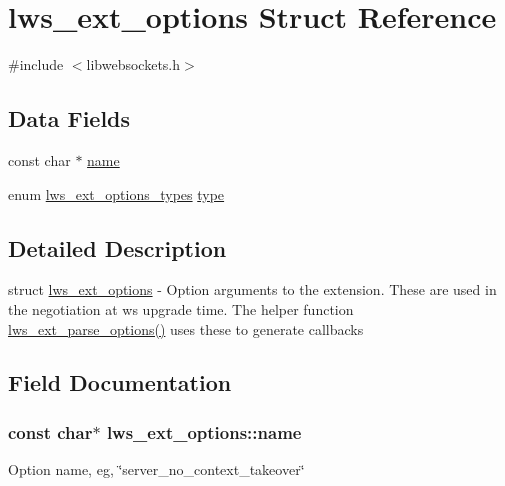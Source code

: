 \hypertarget{structlws__ext__options}{}\section{lws\+\_\+ext\+\_\+options Struct Reference}
\label{structlws__ext__options}


{\ttfamily \#include $<$libwebsockets.\+h$>$}

\subsection*{Data Fields}
\begin{DoxyCompactItemize}
\item 
const char $\ast$ \hyperlink{structlws__ext__options_a1769e4a9805bbdda227821e9578ddc7e}{name}
\item 
enum \hyperlink{group__extensions_gacc9f55936dc165257a2e1f7d47bce89e}{lws\+\_\+ext\+\_\+options\+\_\+types} \hyperlink{structlws__ext__options_a7c4dbd62dbeba63a9d50d2306bd1cc61}{type}
\end{DoxyCompactItemize}


\subsection{Detailed Description}
struct \hyperlink{structlws__ext__options}{lws\+\_\+ext\+\_\+options} -\/ Option arguments to the extension. These are used in the negotiation at ws upgrade time. The helper function \hyperlink{group__extensions_ga6fb3e2c3dfb9d64dc87026a4e99c128b}{lws\+\_\+ext\+\_\+parse\+\_\+options()} uses these to generate callbacks 

\subsection{Field Documentation}
\subsubsection[{\texorpdfstring{name}{name}}]{\setlength{\rightskip}{0pt plus 5cm}const char$\ast$ lws\+\_\+ext\+\_\+options\+::name}\hypertarget{structlws__ext__options_a1769e4a9805bbdda227821e9578ddc7e}{}\label{structlws__ext__options_a1769e4a9805bbdda227821e9578ddc7e}
Option name, eg, \char`\"{}server\+\_\+no\+\_\+context\+\_\+takeover\char`\"{} 
